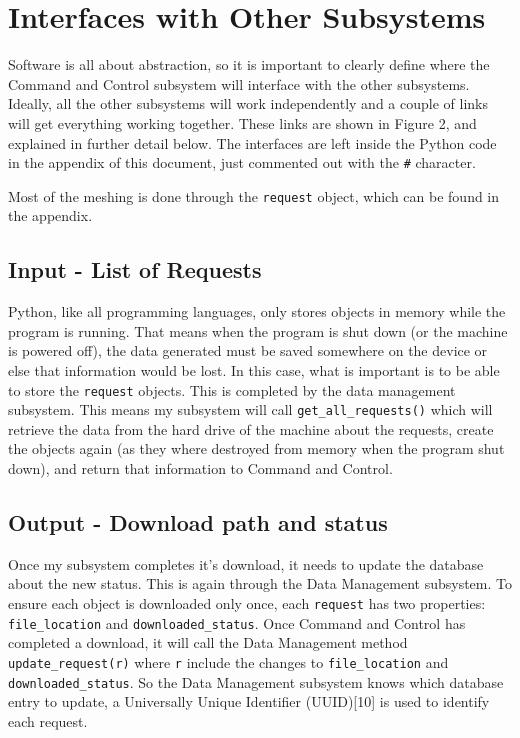 \documentclass{article}
\begin{document}
\section{Interfaces with Other Subsystems}

Software is all about abstraction, so it is important to clearly
define where the Command and Control subsystem will interface with the other
subsystems. Ideally, all the other subsystems will work independently
and a couple of links will get everything working together. These
links are shown in Figure 2, and explained in further detail below.  The
interfaces are left inside the Python code in the appendix of this
document, just commented out with the \texttt{\#} character.

Most of the meshing is done through the \texttt{request} object, which
can be found in the appendix.

\subsection{Input - List of Requests}

Python, like all programming languages, only stores objects in memory while the program is
running. That means when the program is shut down (or the machine is
powered off), the data generated must be saved somewhere on the
device or else that information would be lost. In this case, what is
important is to be able to store the \texttt{request} objects. This is
completed by the data management subsystem. This means my subsystem
will call \texttt{get\_all\_requests()} which will retrieve the data
from the hard drive of the machine
about the requests, create the objects again (as they where destroyed
from memory when the program shut down), and return that information
to Command and Control.

\subsection{Output - Download path and status}

Once my subsystem completes it's download, it needs to update the
database about the new status. This is again through the Data
Management subsystem. To ensure each object is downloaded only once, each
\texttt{request} has two properties: \texttt{file\_location} and
\texttt{downloaded\_status}. Once Command and Control has completed a
download, it will call the Data Management method
\texttt{update\_request(r)} where \texttt{r} include the changes to
\texttt{file\_location} and \texttt{downloaded\_status}. So the
Data Management subsystem knows which database entry to update,
a Universally Unique Identifier (UUID)[10] is used to identify each
request.
\end{document}
